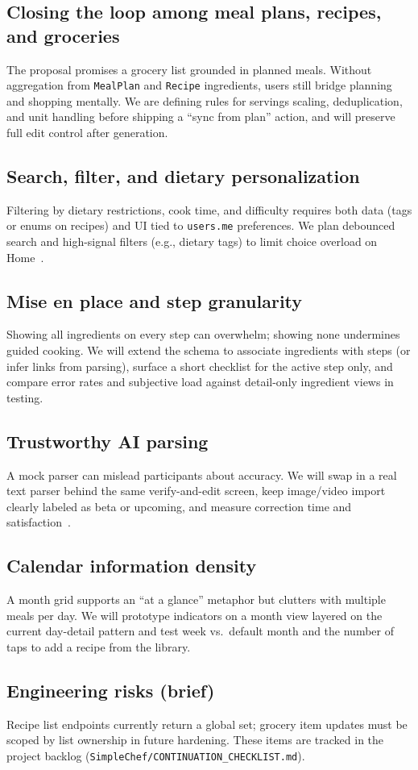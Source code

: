 \subsection{Closing the loop among meal plans, recipes, and groceries}
The proposal promises a grocery list grounded in planned meals. Without aggregation from \texttt{MealPlan} and \texttt{Recipe} ingredients, users still bridge planning and shopping mentally. We are defining rules for servings scaling, deduplication, and unit handling before shipping a ``sync from plan'' action, and will preserve full edit control after generation.

\subsection{Search, filter, and dietary personalization}
Filtering by dietary restrictions, cook time, and difficulty requires both data (tags or enums on recipes) and UI tied to \texttt{users.me} preferences. We plan debounced search and high-signal filters (e.g., dietary tags) to limit choice overload on Home~\cite{hartson2012ux}.

\subsection{Mise en place and step granularity}
Showing all ingredients on every step can overwhelm; showing none undermines guided cooking. We will extend the schema to associate ingredients with steps (or infer links from parsing), surface a short checklist for the active step only, and compare error rates and subjective load against detail-only ingredient views in testing.

\subsection{Trustworthy AI parsing}
A mock parser can mislead participants about accuracy. We will swap in a real text parser behind the same verify-and-edit screen, keep image/video import clearly labeled as beta or upcoming, and measure correction time and satisfaction~\cite{nielsen1994heuristic}.

\subsection{Calendar information density}
A month grid supports an ``at a glance'' metaphor but clutters with multiple meals per day. We will prototype indicators on a month view layered on the current day-detail pattern and test week vs.\ default month and the number of taps to add a recipe from the library.

\subsection{Engineering risks (brief)}
Recipe list endpoints currently return a global set; grocery item updates must be scoped by list ownership in future hardening. These items are tracked in the project backlog (\texttt{SimpleChef/CONTINUATION\_CHECKLIST.md}).
